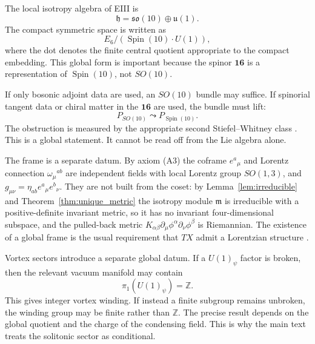 \documentclass[aps,prd,preprint,longbibliography,nofootinbib,superscriptaddress,floatfix]{revtex4-2}
\newcommand{\Spin}{\operatorname{Spin}}
\begin{document}
The local isotropy algebra of EIII is
\begin{equation}
    \mathfrak h
    =
    \mathfrak{so}(10)\oplus\mathfrak u(1).
    \label{eq:app_local_h}
\end{equation}
The compact symmetric space is written as
\begin{equation}
    E_6/(\Spin(10)\cdot U(1)),
    \label{eq:app_spin_u1}
\end{equation}
where the dot denotes the finite central quotient appropriate to the compact
embedding. This global form is important because the spinor \(\mathbf{16}\) is
a representation of \(\Spin(10)\), not \(SO(10)\).

If only bosonic adjoint data are used, an \(SO(10)\) bundle may suffice. If
spinorial tangent data or chiral matter in the \(\mathbf{16}\) are used, the
bundle must lift:
\begin{equation}
    P_{SO(10)}
    \leadsto
    P_{\Spin(10)} .
    \label{eq:app_spin_lift}
\end{equation}
The obstruction is measured by the appropriate second Stiefel--Whitney class
\cite{LawsonMichelsohn,Nakahara}. This is a global statement. It cannot be read
off from the Lie algebra alone.

The frame is a separate datum. By axiom (A3) the coframe \(e^a{}_\mu\) and
Lorentz connection \(\omega_\mu{}^{ab}\) are independent fields with local
Lorentz group \(SO(1,3)\), and \(g_{\mu\nu}=\eta_{ab}e^a{}_\mu e^b{}_\nu\). They
are not built from the coset: by Lemma~\ref{lem:irreducible} and
Theorem~\ref{thm:unique_metric} the isotropy module \(\mathfrak m\) is
irreducible with a positive-definite invariant metric, so it has no invariant
four-dimensional subspace, and the pulled-back metric
\(K_{\alpha\beta}\partial_\mu\phi^\alpha\partial_\nu\phi^\beta\) is Riemannian.
The existence of a global frame is the usual requirement that \(TX\) admit a
Lorentzian structure \cite{KibbleSciama,HehlReview}.

Vortex sectors introduce a separate global datum. If a \(U(1)_\psi\) factor is
broken, then the relevant vacuum manifold may contain
\begin{equation}
    \pi_1(U(1)_\psi)=\mathbb Z.
    \label{eq:app_u1_pi1}
\end{equation}
This gives integer vortex winding. If instead a finite subgroup remains
unbroken, the winding group may be finite rather than \(\mathbb Z\). The
precise result depends on the global quotient and the charge of the condensing
field. This is why the main text treats the solitonic sector as conditional.
\end{document}

